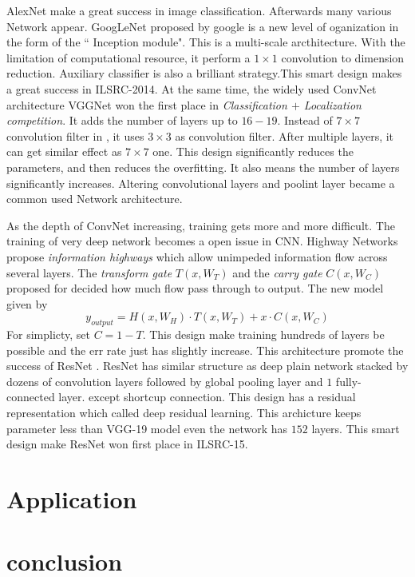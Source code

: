 \documentclass[10pt,twocolumn,letterpaper]{article}
\begin{document}
\par
AlexNet make a great success in image classification. Afterwards many various Network appear. GoogLeNet\cite{} proposed by google is a new level of oganization in the form of the `` Inception module". This is a multi-scale arcthitecture. With the limitation of computational resource, it perform a $1\times 1 $ convolution to dimension reduction. Auxiliary classifier is also a brilliant strategy.This smart design makes a great success in ILSRC-2014. At the same time, the widely used ConvNet architecture VGGNet\cite{}  won the first place in \textit{Classification $+$ Localization competition}. It adds the number of layers up to $16-19$. Instead of $7\times 7$ convolution filter in \cite{}, it uses $3\times 3$ as convolution filter. After multiple layers, it can get similar effect as $7\times 7 $ one. This design significantly reduces the parameters, and then reduces the overfitting. It also means the number of layers significantly increases. Altering convolutional layers and poolint layer became a common used Network architecture.
\par
As the depth of ConvNet increasing, training gets more and more difficult. The training of very deep network becomes a open issue in CNN. Highway Networks\cite{} propose \textit{information highways} which allow unimpeded information flow across several layers. The \textit{transform gate} $T(x, W_{T})$ and the \textit{carry gate} $C(x, W_{C})$ proposed for decided how much flow pass through to output. The new model given by
\begin{equation}
  y_{output} = H(x, W_{H})\cdot T(x, W_{T}) + x\cdot C(x, W_{C})
\end{equation}
For simplicty, \cite{} set $C = 1 - T$. This design make training hundreds of layers be possible and the err rate just has slightly increase. This architecture promote the success of ResNet \cite{}. ResNet has similar structure as deep plain network stacked by dozens of convolution layers followed by global pooling layer and $1$ fully-connected layer. except shortcup connection. This design has a residual representation which called deep residual learning. This archicture keeps parameter less than VGG-19 model even the network has $152$ layers. This smart design make ResNet won first place in ILSRC-15.



\section{Application}

\section{conclusion}

{\small


}
\end{document}
